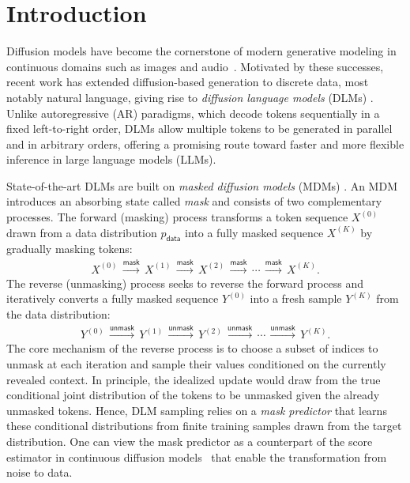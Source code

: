 \documentclass[english]{article}
\newcommand{\data}{\mathsf{data}}
\begin{document}
\medskip


\tableofcontents{}

\section{Introduction}
\label{sec:intro}

Diffusion models \citep{sohl2015deep,ho2020denoising,song2020denoising} have become the cornerstone of modern generative modeling in continuous domains such as images and audio~\citep{dhariwal2021diffusion,rombach2022high}.
%
Motivated by these successes, recent work has extended diffusion-based generation to discrete data, most notably natural language, giving rise to \textit{diffusion language models} (DLMs) \citep{sahoo2024simple,nie2025large}.
Unlike autoregressive (AR) paradigms, which decode tokens sequentially in a fixed left-to-right order, DLMs allow multiple tokens to be generated in parallel and in arbitrary orders, offering a promising route toward faster and more flexible inference in large language models (LLMs).

State-of-the-art DLMs are built on \textit{masked diffusion models} (MDMs) \citep{austin2021structured,campbell2022continuous,shi2024simplified}.
An MDM introduces an absorbing state called \textit{mask} and consists of two complementary processes. The forward (masking) process transforms a token sequence $X^{(0)}$ drawn from a data distribution $p_\data$ into a fully masked sequence $X^{(K)}$ by gradually masking tokens:
\begin{align*}
    X^{(0)} \,\overset{\mathsf{mask}}{\longrightarrow}\, X^{(1)}
        \,\overset{\mathsf{mask}}{\longrightarrow}\, X^{(2)}
     \,\overset{\mathsf{mask}}{\longrightarrow}\, \cdots
     \,\overset{\mathsf{mask}}{\longrightarrow}\, X^{(K)}.
\end{align*}
The reverse (unmasking) process seeks to reverse the forward process and iteratively converts a fully masked sequence $Y^{(0)}$ into a fresh sample $Y^{(K)}$ from the data distribution:
\begin{align*}
    Y^{(0)} \,\overset{\mathsf{unmask}}{\longrightarrow}\, Y^{(1)}
     \,\overset{\mathsf{unmask}}{\longrightarrow}\, Y^{(2)} 
     \,\overset{\mathsf{unmask}}{\longrightarrow}\, \cdots
     \,\overset{\mathsf{unmask}}{\longrightarrow}\, Y^{(K)}.
\end{align*}
The core mechanism of the reverse process is to choose a subset of indices to unmask at each iteration and sample their values conditioned on the currently revealed context.
In principle, the idealized update would draw from the true conditional joint distribution of the tokens to be unmasked given the already unmasked tokens. 
%
Hence, DLM sampling relies on a \textit{mask predictor} that learns these conditional distributions from finite training samples drawn from the target distribution.
%
One can view the mask predictor as a counterpart of the score estimator in continuous diffusion models~\citep{song2019generative} that enable the transformation from noise to data.
\end{document}
